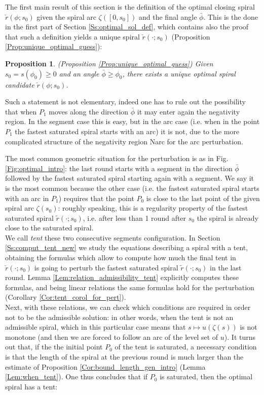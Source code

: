 \documentclass[reqno]{amsart}
\theoremstyle{definition} \newtheorem{definition}{Definition}[section]
\theoremstyle{definition} \newtheorem{remark}[definition]{Remark}
\theoremstyle{plain} \newtheorem{lemma}[definition]{Lemma}
\theoremstyle{plain} \newtheorem{proposition}[definition]{Proposition}
\theoremstyle{plain} \newtheorem{theorem}[definition]{Theorem}
\theoremstyle{plain} \newtheorem{corollary}[definition]{Corollary}
\theoremstyle{definition} \newtheorem{example}[definition]{Example}
\theoremstyle{plain} \newtheorem{claim}[clai]{Claim}
\theoremstyle{definition} \newtheorem{assumption}[definition]{Assumption}
\theoremstyle{definition} \newtheorem{observation}[definition]{Observation}
\newcommand{\1}{\mathbbm 1}
\numberwithin{equation}{section} %
\theoremstyle{plain} \newtheorem*{theorem*}{Theorem}
\theoremstyle{plain} \newtheorem{mthm}[maintheorem]{Main Theorem}
\theoremstyle{plain} \newtheorem*{mthm*}{Main Theorem}
\theoremstyle{plain} \newtheorem*{conjecture*}{Conjecture}
\theoremstyle{plain} \newtheorem{conjecture}[definition]{Conjecture}
\theoremstyle{plain} \newtheorem*{problem*}{Problem}
\begin{document}
The first main result of this section is the definition of the optimal closing spiral $\check r(\phi;s_0)$ given the spiral arc $\zeta([0,s_0])$ and the final angle $\bar \phi$. This is the done in the first part of Section \ref{Ss:optimal_sol_def}, which contains also the proof that such a definition yields a unique spiral $\check r(\cdot;s_0)$ (Proposition \ref{Prop:unique_optimal_guess}{\color{red})}:

\begin{proposition}(Proposition \ref{Prop:unique_optimal_guess})
\label{Prop:unique_optimal_guess_intro}
Given $s_0 = s(\phi_0) \geq 0$ and an angle $\bar \phi \geq \phi_0$, there exists a unique optimal spiral candidate $\check r(\phi;s_0)$.
\end{proposition}

Such a statement is not elementary, indeed one has to rule out the possibility that when $P_1$ moves along the direction $\bar \phi$ it may enter again the negativity region. In the segment case this is easy, but in the arc case (i.e. when in the point $P_1$ the fastest saturated spiral starts with an arc) it is not, due to the more complicated structure of the negativity region \gls{Narc} for the arc perturbation.

\medskip 

The most common geometric situation for the perturbation is as in Fig. \ref{Fig:optimal_intro}: the last round starts with a segment in the direction $\bar \phi$ followed by the fastest saturated spiral starting again with a segment. We say it is the most common because the other case (i.e. the fastest saturated spiral starts with an arc in $P_1$) requires that the point $P_0$ is close to the last point of the given spiral arc $\zeta(s_0)$: roughly speaking, this is a regularity property of the fastest saturated spiral $\tilde r(\cdot;s_0)$, i.e. after less than 1 round after $s_0$ the spiral is already close to the saturated spiral. \\
We call \emph{tent} these two consecutive segments configuration. In Section \ref{Ss:comput_tent_new} we study the equations describing a spiral with a tent, obtaining the formulas which allow to compute how much the final tent in $\check r(\cdot;s_0)$ is going to perturb the fastest saturated spiral $\tilde r(\cdot;s_0)$ in the last round. Lemma \ref{Lem:relation_admissibility_tent} explicitly computes these formulas, and being linear relations the same formulas hold for the perturbation (Corollary \ref{Cor:tent_corol_for_pert}). \\
Next, with these relations, we can check which conditions are required in order  not to be the admissible solution: in other words, when the tent is not an admissible spiral, which in this particular case means that $s \mapsto u(\zeta(s))$ is not monotone (and then we are forced to follow an arc of the level set of $u$). It turns out that, if the the initial point $P_0$ of the tent is saturated, a necessary condition is that the length of the spiral at the previous round is much larger than the estimate of Proposition \ref{Cor:bound_length_gen_intro} (Lemma \ref{Lem:when_tent}). One thus concludes that if $P_0$ is saturated, then the optimal spiral has a tent:
\end{document}
